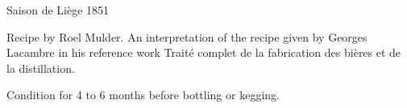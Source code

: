 \begin{recipe}{Saison de Liège 1851}

\begin{aboutblock}
Recipe by Roel Mulder. An interpretation of the recipe given by Georges Lacambre
in his reference work Traité complet de la fabrication des bières et de la
distillation. 
\end{aboutblock}


\begin{methodandtiming}
 
\begin{mashsteps}
\end{mashsteps}

\begin{fermentationsteps}
\end{fermentationsteps}

\begin{directions}
Condition for 4 to 6 months before bottling or kegging.
\end{directions}

\end{methodandtiming}

\recipebreak

\begin{ingredientsblock}

\begin{malts}
\end{malts}

\begin{hops}
\end{hops}


\end{ingredientsblock}

\end{recipe}


